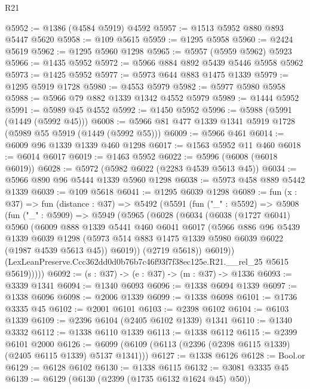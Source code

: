 \begin{lexlean}{R21}
\begin{coremodule}
@5952 := @1386 (@4584 @5919) @4592
@5957 := @1513 @5952 @880 @893 @5447 @5620
@5958 := @109 @5615
@5959 := @1295 @5958
@5960 := @2424 @5619
@5962 := @1295 @5960 @1298
@5965 := @5957 (@5959 @5962) @5923
@5966 := @1435 @5952
@5972 := @5966 @884 @892 @5439 @5446 @5958 @5962
@5973 := @1425 @5952
@5977 := @5973 @644 @883 @1475 @1339
@5979 := @1295 @5919 @1728
@5980 := @4553 @5979
@5982 := @5977 @5980 @5958
@5988 := @5966 @79 @882 @1339 @1342 @4552 @5979
@5989 := @1444 @5952
@5991 := @5989 @45 @4552
@5992 := @1450 @5952
@5996 := @5988 (@5991 (@1449 (@5992 @45)))
@6008 := @5966 @81 @477 @1339 @1341 @5919 @1728 (@5989 @55 @5919 (@1449 (@5992 @55)))
@6009 := @5966 @461
@6014 := @6009 @96 @1339 @1339 @460 @1298
@6017 := @1563 @5952 @11 @460
@6018 := @6014 @6017
@6019 := @1463 @5952
@6022 := @5996 (@6008 (@6018 @6019))
@6028 := @5972 (@5982 @6022 (@2283 @4539 @5613 @45))
@6034 := @5966 @890 @96 @5444 @1339 @5960 @1298
@6038 := @5973 @458 @889 @5442 @1339
@6039 := @109 @5618
@6041 := @1295 @6039 @1298
@6089 := fun (x : @37) =>
  fun (distance : @37) =>
  @5492
    (@5591
      (fun ("_" : @5592) =>
      @5908
        (fun ("_" : @5909) =>
        @5949
          (@5965
            (@6028
              (@6034
                (@6038
                  (@1727 @6041)
                  @5960
                  (@6009
                    @888
                    @1339
                    @5441
                    @460
                    @6041
                    @6017
                    (@5966
                      @886
                      @96
                      @5439
                      @1339
                      @6039
                      @1298
                      (@5973 @514 @883 @1475 @1339 @5980 @6039 @6022 (@1987 @4539 @5613 @45))
                      @6019))
                  (@2719 @5618))
                @6019))
            (LexLeanPreserve.Ccc362dd0d0b76b7c46f93f7f38ec125e.R21.__rel_25 @5615 @5619)))))
@6092 := (s : @37) -> (e : @37) -> (m : @37) -> @1336
@6093 := @3339 @1341
@6094 := @1340 @6093
@6096 := @1338 @6094 @1339
@6097 := @1338 @6096
@6098 := @2006 @1339
@6099 := @1338 @6098
@6101 := @1736 @3335 @45
@6102 := @2001 @6101
@6103 := @2398 @6102
@6104 := @6103 @1339
@6109 := @2396 @6104 (@2405 @6102 @1339) @1341
@6110 := @1340 @3332
@6112 := @1338 @6110 @1339
@6113 := @1338 @6112
@6115 := @2399 @6101 @2000
@6126 := @6099 (@6109 (@6113 (@2396 (@2398 @6115 @1339) (@2405 @6115 @1339) @5137 @1341)))
@6127 := @1338 @6126
@6128 := Bool.or
@6129 := @6128 @6102
@6130 := @1338 @6115
@6132 := @3081 @3335 @45
@6139 := @6129 (@6130 (@2399 (@1735 @6132 @1624 @45) @50))

\end{coremodule}
\end{lexlean}
